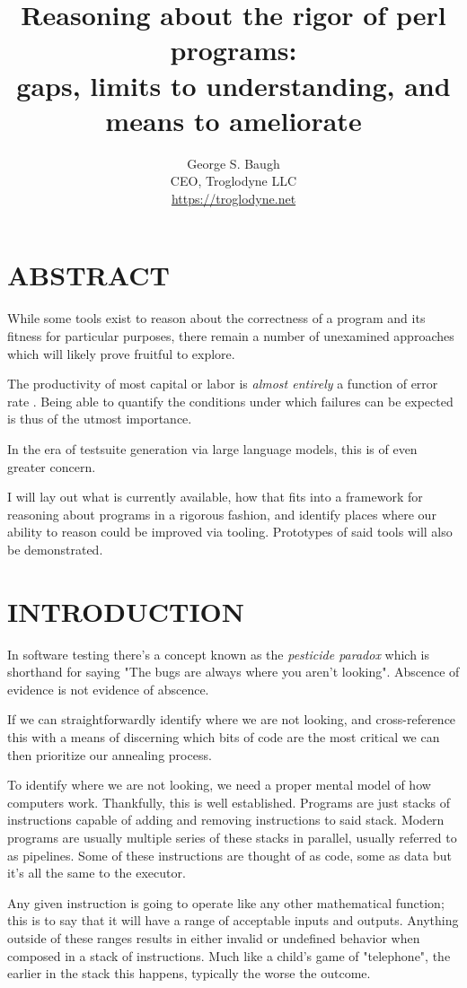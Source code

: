 \documentclass{article}
\title{%
    Reasoning about the rigor of perl programs: \\
    \large gaps, limits to understanding, and means to ameliorate
}
\author{%
    George S. Baugh \\
    \large CEO, Troglodyne LLC \\
    \url{https://troglodyne.net}
}
\begin{document}
\maketitle

\section{ABSTRACT}

While some tools exist to reason about the correctness of a program and its fitness for particular purposes,
there remain a number of unexamined approaches which will likely prove fruitful to explore.

The productivity of most capital or labor is \textit{almost entirely} a function of error rate \cite{oring}.
Being able to quantify the conditions under which failures can be expected is thus of the utmost importance.

In the era of testsuite generation via large language models, this is of even greater concern.

I will lay out what is currently available, how that fits into a framework for reasoning about programs
in a rigorous fashion, and identify places where our ability to reason could be improved via tooling.
Prototypes of said tools will also be demonstrated.

\newpage
\section{INTRODUCTION}

In software testing there's a concept known as the \textit{pesticide paradox} \cite{bezier} which is shorthand for saying
"The bugs are always where you aren't looking".  Abscence of evidence is not evidence of abscence.

If we can straightforwardly identify where we are not looking, and cross-reference this with
a means of discerning which bits of code are the most critical we can then prioritize our annealing process.

To identify where we are not looking, we need a proper mental model of how computers work.
Thankfully, this is well established.
Programs are just stacks of instructions capable of adding and removing instructions to said stack.
Modern programs are usually multiple series of these stacks in parallel, usually referred to as pipelines.
Some of these instructions are thought of as code, some as data but it's all the same to the executor.

Any given instruction is going to operate like any other mathematical function;
this is to say that it will have a range of acceptable inputs and outputs.
Anything outside of these ranges results in either invalid or undefined behavior when composed in a stack of instructions.
Much like a child's game of "telephone", the earlier in the stack this happens, typically the worse the outcome.
\end{document}
